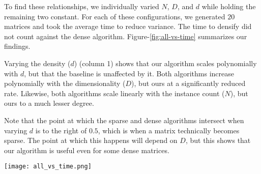 \documentclass{article}
\begin{document}
To find these relationships, we individually varied $N$, $D$, and $d$ while holding the remaining two constant.
For each of these configurations, we generated $20$ matrices and took the average time to reduce variance.
The time to densify did not count against the dense algorithm.
Figure-\ref{fig:all-vs-time} summarizes our findings.

Varying the density ($d$) (column 1) shows that our algorithm scales polynomially with $d$, but that the baseline is unaffected by it.
Both algorithms increase polynomially with the dimensionality ($D$), but ours at a significantly reduced rate.
Likewise, both algorithms scale linearly with the instance count ($N$), but ours to a much lesser degree.

Note that the point at which the sparse and dense algorithms intersect when varying $d$ is to the right of $0.5$, which is when a matrix technically becomes sparse.
The point at which this happens will depend on $D$, but this shows that our algorithm is useful even for some dense matrices.

\begin{figure*}[ht!]
\vskip 0.2in
\begin{center}
\centerline{\texttt{[image: all\_vs\_time.png]}}
\caption{
Summary performance comparison plots for quadratic (top) and cubic (bottom) cases showing how the algorithm's performance varies with $d$, $D$, and $N$; our sparse algorithm is shown in blue, the dense algorithm in red. Each point in each graph is an average of 20 runs, and the time used in densification is not included in the dense-algorithm timings. In the quadratic case, sparsity loses its advantage at about 67\%, and at about 77\% for the cubic case, though these precise intersections depend on $D$. In general, taking advantage of sparsity shows large benefits, so large that it's difficult to see that the performance does not actually change linearly with $D$ (column 2); figure \ref{fig:sparse_D_and_N_vs_time} gives further details.}
\label{fig:all-vs-time}
\end{center}
\vskip -0.2in
\end{figure*}
\end{document}
